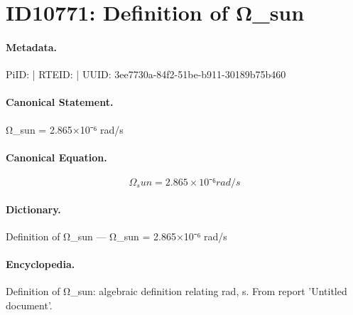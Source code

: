 \section*{ID10771: Definition of Ω\_sun}
\paragraph{Metadata.}
PiID:  | RTEID:  | UUID: 3ee7730a-84f2-51be-b911-30189b75b460

\paragraph{Canonical Statement.}
Ω\_sun = 2.865×10⁻⁶ rad/s

\paragraph{Canonical Equation.}
\[
Ω_sun = 2.865×10⁻⁶ rad/s
\]

\paragraph{Dictionary.}
Definition of Ω\_sun — Ω\_sun = 2.865×10⁻⁶ rad/s

\paragraph{Encyclopedia.}
Definition of Ω\_sun: algebraic definition relating rad, s. From report 'Untitled document'.
